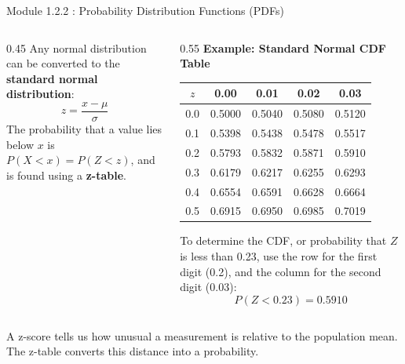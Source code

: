 \documentclass{beamer}
\begin{document}
\begin{frame}{Module 1.2.2 : Probability Distribution Functions (PDFs)}
\scriptsize
\begin{columns}
\begin{column}{0.45\textwidth}
Any normal distribution can be converted to the \textbf{standard normal distribution}:
\begin{equation}
z = \frac{x-\mu}{\sigma}
\end{equation}
The probability that a value lies below $x$ is $P(X<x)=P(Z<z)$, and is found using a \textbf{z-table}.
\end{column}
\begin{column}{0.55\textwidth}
\textbf{Example: Standard Normal CDF Table} \\ \vspace{0.25cm}
\begin{tabular}{c|cccc}
$z$ & 0.00 & 0.01 & 0.02 & 0.03 \\ 
\hline
0.0 &0.5000&0.5040&0.5080&0.5120\\
0.1 &0.5398&0.5438&0.5478&0.5517\\
0.2 &0.5793&0.5832&0.5871&0.5910\\
0.3 &0.6179&0.6217&0.6255&0.6293\\
0.4 &0.6554&0.6591&0.6628&0.6664\\
0.5 &0.6915&0.6950&0.6985&0.7019
\end{tabular}
\vspace{0.25cm}

To determine the CDF, or probability that $Z$ is less than 0.23, use the row for the first digit (0.2), and the column for the second digit (0.03):
\begin{equation}
P(Z<0.23)=0.5910
\end{equation}
\end{column}
\end{columns}
\vspace{0.25cm}
A z-score tells us how unusual a measurement is relative to the population mean.  The z-table converts this distance into a probability.
\end{frame}
\end{document}
